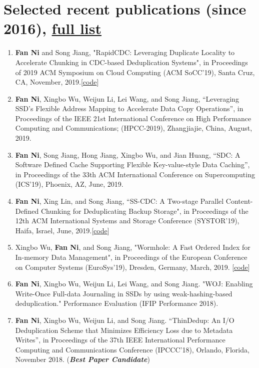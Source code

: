\documentclass{article}
\begin{document}
\section{Selected recent publications (since 2016), \href{https://scholar.google.com/citations?user=xMbxve0AAAAJ&hl=en}{full list}}
\begin{enumerate}
\small
\it
    \item \textbf{Fan Ni} and Song Jiang, "RapidCDC: Leveraging Duplicate Locality to Accelerate Chunking in CDC-based Deduplication Systems", in Proceedings of 2019 ACM Symposium on Cloud Computing (ACM SoCC'19), Santa Cruz, CA, November, 2019.[\href{https://github.com/moking/RapidCDC}{code}]
    \item \textbf{Fan Ni}, Xingbo Wu, Weijun Li, Lei Wang, and Song Jiang, “Leveraging SSD's Flexible Address Mapping to Accelerate Data Copy Operations”, in Proceedings of the IEEE 21st International Conference on High Performance Computing and Communications; (HPCC-2019), Zhangjiajie, China, August, 2019.
    \item \textbf{Fan Ni}, Song Jiang, Hong Jiang, Xingbo Wu, and Jian Huang, “SDC: A Software Defined Cache Supporting Flexible Key-value-style Data Caching”, in Proceedings of the 33th ACM International Conference on Supercomputing (ICS'19), Phoenix, AZ, June, 2019.
\item \textbf{Fan Ni}, Xing Lin, and Song Jiang, “SS-CDC: A Two-stage Parallel Content-Defined Chunking for Deduplicating Backup Storage", in Proceedings of the 12th ACM International Systems and Storage Conference (SYSTOR'19), Haifa, Israel, June, 2019.[\href{https://github.com/NetApp/SS-CDC}{code}]
\item Xingbo Wu, \textbf{Fan Ni}, and Song Jiang, "Wormhole: A Fast Ordered Index for In-memory Data Management", in Proceedings of the European Conference on Computer Systems (EuroSys'19), Dresden, Germany, March, 2019. [\href{https://github.com/wuxb45/wormhole}{code}]
\item \textbf{Fan Ni}, Xingbo Wu, Weijun Li, Lei Wang, and Song Jiang. "WOJ: Enabling Write-Once Full-data Journaling in SSDs by using weak-hashing-based deduplication." Performance Evaluation (IFIP Performance 2018).
\item \textbf{Fan Ni}, Xingbo Wu, Weijun Li, and Song Jiang. “ThinDedup: An I/O Deduplication Scheme that Minimizes Efficiency Loss due to Metadata Writes”, in Proceedings of the 37th IEEE International Performance Computing and Communications Conference (IPCCC'18), Orlando, Florida, November 2018. (\textbf{\it \textbf{Best Paper Candidate}})

\end{enumerate}
\end{document}
